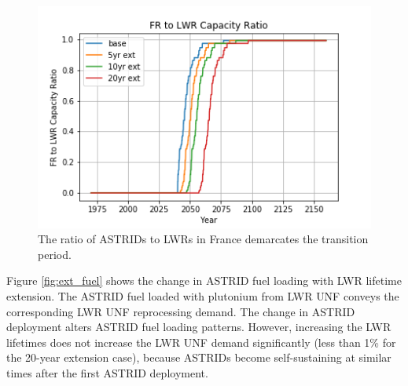 \begin{figure}[htbp!]
    \begin{center}
        \includegraphics[scale=0.7]{./images/sensitivity/pow_ratio.png}
    \end{center}
    \caption{The ratio of \glspl{ASTRID} to \glspl{LWR} in France demarcates 
    the transition period.}
    \label{fig:pow_diff}
\end{figure}


Figure \ref{fig:ext_fuel} shows the change in \gls{ASTRID} fuel loading with
\gls{LWR} lifetime extension. The \gls{ASTRID} fuel loaded with plutonium
from \gls{LWR} \gls{UNF} conveys the corresponding \gls{LWR} \gls{UNF} reprocessing demand.
The change in \gls{ASTRID} deployment alters \gls{ASTRID} fuel loading patterns.
However, increasing the \gls{LWR} lifetimes
does not increase the \gls{LWR} \gls{UNF} demand significantly (less than 1\%
for the 20-year extension case),
because \glspl{ASTRID} become self-sustaining at similar times after the first
\gls{ASTRID} deployment.

